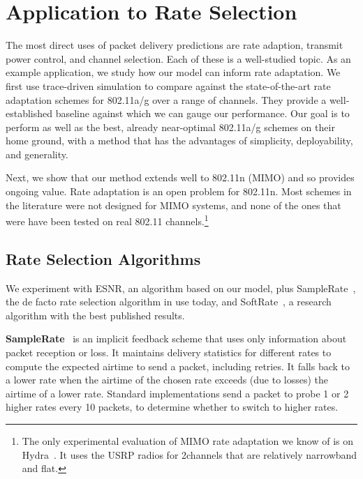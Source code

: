 \ifx\mainfile\undefined

\setcounter{chapter}{6} %
\fi

\cleardoublepage
\chapter{Application to Rate Selection}
\label{chap:rate}

The most direct uses of packet delivery predictions are rate adaption, transmit power control, and channel selection. Each of these is a well-studied topic. As an example application, we study how our model can inform rate adaptation. We first use trace-driven simulation to compare against the state-of-the-art rate adaptation schemes for 802.11a/g over a range of channels. They provide a well-established baseline against which we can gauge our performance. Our goal is to perform as well as the best, already near-optimal 802.11a/g schemes on their home ground, with a method that has the advantages of simplicity, deployability, and generality.

Next, we show that our method extends well to 802.11n (MIMO) and so provides ongoing value. Rate adaptation is an open problem for 802.11n. Most schemes in the literature were not designed for MIMO systems, and none of the ones that were have been tested on real 802.11 channels.\footnote{The only experimental evaluation of MIMO rate adaptation we know of is on Hydra~\cite{Kim_Hydra}. It uses the USRP radios for 2\MHz channels that are relatively narrowband and flat.} 

\section{Rate Selection Algorithms}
We experiment with ESNR, an algorithm based on our model, plus SampleRate~\cite{Bicket_SampleRate}, the de facto rate selection algorithm in use today, and SoftRate~\cite{Vutukuru_SoftRate}, a research algorithm with the best published results.

\textbf{SampleRate}~\cite{Bicket_SampleRate} is an implicit feedback scheme that uses only information about packet reception or loss.
It maintains delivery statistics for different rates to compute the expected airtime to send a packet, including retries.
It falls back to a lower rate when the airtime of the chosen rate exceeds (due to losses) the airtime of a lower rate.
Standard implementations send a packet to probe 1 or 2 higher rates every 10 packets, to determine whether to switch to higher rates.

